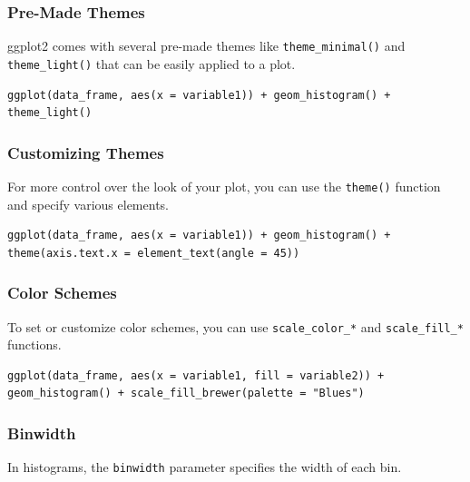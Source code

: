 \documentclass[
  b5paper]{book}
\begin{document}
\hypertarget{pre-made-themes}{%
\subsubsection*{Pre-Made Themes}\label{pre-made-themes}}

ggplot2 comes with several pre-made themes like \texttt{theme\_minimal()} and \texttt{theme\_light()} that can be easily applied to a plot.

\begin{verbatim}
ggplot(data_frame, aes(x = variable1)) + geom_histogram() + theme_light()
\end{verbatim}

\hypertarget{customizing-themes}{%
\subsubsection*{Customizing Themes}\label{customizing-themes}}

For more control over the look of your plot, you can use the \texttt{theme()} function and specify various elements.

\begin{verbatim}
ggplot(data_frame, aes(x = variable1)) + geom_histogram() + theme(axis.text.x = element_text(angle = 45))
\end{verbatim}

\hypertarget{color-schemes}{%
\subsubsection*{Color Schemes}\label{color-schemes}}

To set or customize color schemes, you can use \texttt{scale\_color\_*} and \texttt{scale\_fill\_*} functions.

\begin{verbatim}
ggplot(data_frame, aes(x = variable1, fill = variable2)) + geom_histogram() + scale_fill_brewer(palette = "Blues")
\end{verbatim}

\hypertarget{binwidth}{%
\subsubsection*{Binwidth}\label{binwidth}}

In histograms, the \texttt{binwidth} parameter specifies the width of each bin.
\end{document}

